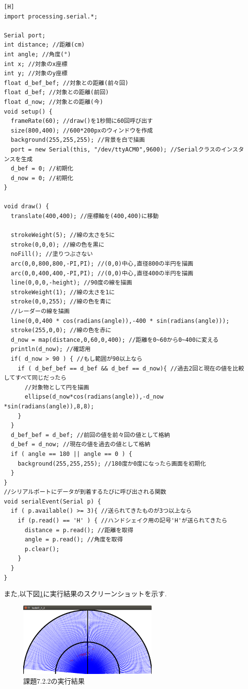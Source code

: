 \documentclass{jarticle}
\begin{document}
\begin{lstlisting}[caption = 課題7.2.2(Processing),label=code:kadai7-2-2-p][H]
import processing.serial.*;

Serial port;
int distance; //距離(cm)
int angle; //角度(°)
int x; //対象のx座標
int y; //対象のy座標
float d_bef_bef; //対象との距離(前々回)
float d_bef; //対象との距離(前回)
float d_now; //対象との距離(今)
void setup() {
  frameRate(60); //draw()を1秒間に60回呼び出す
  size(800,400); //600*200pxのウィンドウを作成
  background(255,255,255); //背景を白で描画
  port = new Serial(this, "/dev/ttyACM0",9600); //Serialクラスのインスタンスを生成
  d_bef = 0; //初期化
  d_now = 0; //初期化
}

void draw() {
  translate(400,400); //座標軸を(400,400)に移動
  
  strokeWeight(5); //線の太さを5に
  stroke(0,0,0); //線の色を黒に
  noFill(); //塗りつぶさない
  arc(0,0,800,800,-PI,PI); //(0,0)中心,直径800の半円を描画
  arc(0,0,400,400,-PI,PI); //(0,0)中心,直径400の半円を描画
  line(0,0,0,-height); //90度の線を描画
  strokeWeight(1); //線の太さを1に
  stroke(0,0,255); //線の色を青に
  //レーダーの線を描画
  line(0,0,400 * cos(radians(angle)),-400 * sin(radians(angle)));
  stroke(255,0,0); //線の色を赤に
  d_now = map(distance,0,60,0,400); //距離を0~60から0~400に変える
  println(d_now); //確認用
  if( d_now > 90 ) { //もし範囲が90以上なら
    if ( d_bef_bef == d_bef && d_bef == d_now){ //過去2回と現在の値を比較してすべて同じだったら
      //対象物として円を描画
      ellipse(d_now*cos(radians(angle)),-d_now *sin(radians(angle)),8,8);
    }
  }
  d_bef_bef = d_bef; //前回の値を前々回の値として格納
  d_bef = d_now; //現在の値を過去の値として格納
  if ( angle == 180 || angle == 0 ) {
    background(255,255,255); //180度か0度になったら画面を初期化
  }
}
//シリアルポートにデータが到着するたびに呼び出される関数
void serialEvent(Serial p) {
  if ( p.available() >= 3){ //送られてきたものが3つ以上なら
    if (p.read() == 'H' ) { //ハンドシェイク用の記号'H'が送られてきたら
      distance = p.read(); //距離を取得
      angle = p.read(); //角度を取得
      p.clear();
    }
  }
}
\end{lstlisting}

また,以下図\ref{fig:kadai7-2-2}に実行結果のスクリーンショットを示す.

\begin{figure}[H]
\begin{center}
\includegraphics[width=7.0cm]{images/kadai7-2-2-yoi.png}
\caption{課題7.2.2の実行結果}
\label{fig:kadai7-2-2}
\end{center}
\end{figure}
\end{document}
